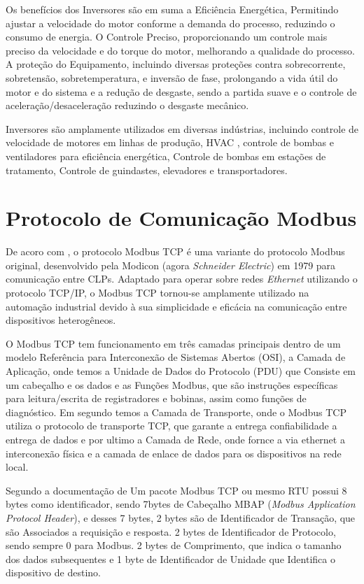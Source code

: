 Os benefícios dos Inversores são em suma a Eficiência Energética, Permitindo ajustar a velocidade do motor conforme a demanda do processo, reduzindo o consumo de energia. O Controle Preciso, proporcionando um controle mais preciso da velocidade e do torque do motor, melhorando a qualidade do processo. A proteção do Equipamento, incluindo diversas proteções contra sobrecorrente, sobretensão, sobretemperatura, e inversão de fase, prolongando a vida útil do motor e do sistema e a
redução de desgaste, sendo a partida suave e o controle de aceleração/desaceleração reduzindo o desgaste mecânico.

Inversores são amplamente utilizados em diversas indústrias, incluindo controle de velocidade de motores em linhas de produção, HVAC , controle de bombas e ventiladores para eficiência energética, Controle de bombas em estações de tratamento, Controle de guindastes, elevadores e transportadores.

\section{Protocolo de Comunicação Modbus}

De acoro com \cite{modbus2006}, o protocolo Modbus TCP é uma variante do protocolo Modbus original, desenvolvido pela Modicon (agora \textit{Schneider Electric}) em 1979 para comunicação entre CLPs. Adaptado para operar sobre redes \textit{Ethernet} utilizando o protocolo TCP/IP, o Modbus TCP tornou-se amplamente utilizado na automação industrial devido à sua simplicidade e eficácia na comunicação entre dispositivos heterogêneos.

O Modbus TCP tem funcionamento em três camadas principais dentro de um modelo  Referência para Interconexão de Sistemas Abertos (OSI), a Camada de Aplicação, onde temos a  Unidade de Dados do Protocolo (PDU) que Consiste em um cabeçalho e os dados e as Funções Modbus, que são instruções específicas para leitura/escrita de registradores e bobinas, assim como funções de diagnóstico.
Em segundo temos a Camada de Transporte, onde o Modbus TCP utiliza o protocolo de transporte TCP, que garante a entrega confiabilidade a entrega de dados e por ultimo a Camada de Rede, onde fornce a via ethernet a interconexão física e a camada de enlace de dados para os dispositivos na rede local.


Segundo a documentação de \cite{modbus2006} Um pacote Modbus TCP ou mesmo RTU possui 8 bytes como identificador, sendo 7bytes de  Cabeçalho MBAP (\textit{Modbus Application Protocol Header}), e desses 7 bytes, 2 bytes são de Identificador de Transação, que são Associados a requisição e resposta. 2 bytes de Identificador de Protocolo, sendo sempre 0 para Modbus. 2 bytes de Comprimento, que indica o tamanho dos dados subsequentes e 1 byte de Identificador de Unidade que Identifica o dispositivo de destino.

